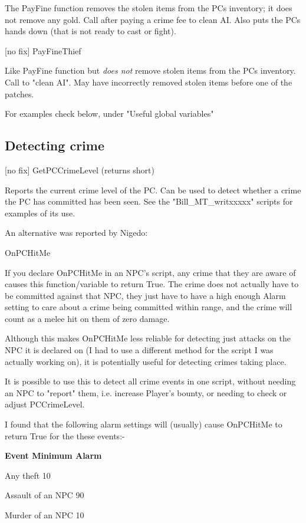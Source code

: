 The PayFine function removes the stolen items from the PCs inventory; it
does not remove any gold. Call after paying a crime fee to clean AI.
Also puts the PCs hands down (that is not ready to cast or fight).

{[}no fix{]} PayFineThief

Like PayFine function but \emph{does not} remove stolen items from the
PCs inventory. Call to "clean AI". May have incorrectly removed stolen
items before one of the patches.

For examples check below, under "Useful global variables"

\hypertarget{detecting-crime}{%
\subsection{Detecting crime}\label{detecting-crime}}

{[}no fix{]} GetPCCrimeLevel (returns short)

Reports the current crime level of the PC. Can be used to detect whether
a crime the PC has committed has been seen. See the
"Bill\_MT\_writxxxxx" scripts for examples of its use.

An alternative was reported by Nigedo:

OnPCHitMe

If you declare OnPCHitMe in an NPC's script, any crime that they are
aware of causes this function/variable to return True. The crime does
not actually have to be committed against that NPC, they just have to
have a high enough Alarm setting to care about a crime being committed
within range, and the crime will count as a melee hit on them of zero
damage.

Although this makes OnPCHitMe less reliable for detecting just attacks
on the NPC it is declared on (I had to use a different method for the
script I was actually working on), it is potentially useful for
detecting crimes taking place.

It is possible to use this to detect all crime events in one script,
without needing an NPC to "report" them, i.e. increase Player's bounty,
or needing to check or adjust PCCrimeLevel.

I found that the following alarm settings will (usually) cause OnPCHitMe
to return True for the these events:-

\textbf{Event Minimum Alarm}

Any theft 10

Assault of an NPC 90

Murder of an NPC 10

